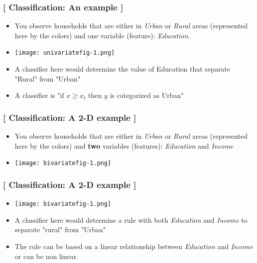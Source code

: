 \documentclass[xcolor=x11names,compress, aspectratio=169]{beamer}
\renewcommand{\(}{\begin{columns}}
\renewcommand{\)}{\end{columns}}
\newcommand{\<}[1]{\begin{column}{#1}}
\renewcommand{\>}{\end{column}}
\begin{document}
\begin{frame} %
\frametitle{\textcolor{brique}{[ Classification:  An example ]}}
\pause
\begin{itemize}[<+->]
  \item You observe households that are either in \textit{Urban} or \textit{Rural} areas (represented here by the colors) and one variable (feature): \textit{Education}. 
  \item[] \begin{center}\texttt{[image: univariatefig-1.png]} \end{center}
  \item A classifier here would determine the value of Education that separate "Rural" from  "Urban" 
  \item A classifier is "if $x \geq x_t$  then $y$ is categorized as Urban" 
\end{itemize}
\end{frame}



\begin{frame} %
\frametitle{\textcolor{brique}{[ Classification:  A 2-D example ]}}
\pause
\begin{itemize}[<+->]
  \item You observe households that are either in \textit{Urban} or \textit{Rural} areas (represented here by the colors) and \textbf{two} variables (features): \textit{Education} and \textit{Income}
  \item[] \begin{center}\texttt{[image: bivariatefig-1.png]} \end{center}
\end{itemize}
\end{frame}




\begin{frame} %
\frametitle{\textcolor{brique}{[ Classification:  A 2-D example ]}}
\pause
\begin{itemize}[<+->]
  \item[] \begin{center}\texttt{[image: bivariatefig-1.png]} \end{center}
   \item A classifier here would determine a rule with both \textit{Education}  and \textit{Income} to separate "rural" from "Urban"
  \item The rule can be based on a linear relationship between \textit{Education}  and \textit{Income} or can be non linear.
\end{itemize}
\end{frame}
\end{document}
